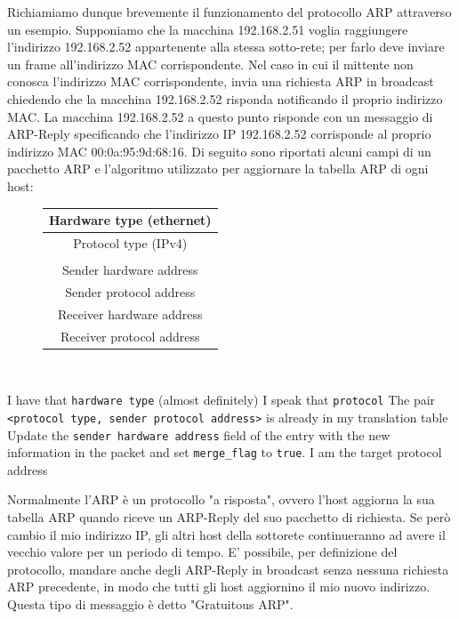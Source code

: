 Richiamiamo dunque brevemente il funzionamento del protocollo ARP attraverso un esempio. Supponiamo che la macchina 192.168.2.51 voglia raggiungere l'indirizzo 192.168.2.52 appartenente alla stessa sotto-rete; per farlo deve inviare un frame all'indirizzo MAC corrispondente. Nel caso in cui il mittente non conosca l'indirizzo MAC corrispondente, invia una richiesta ARP in broadcast chiedendo che la macchina 192.168.2.52 risponda notificando il proprio indirizzo MAC. La macchina 192.168.2.52 a questo punto risponde con un messaggio di ARP-Reply specificando che l'indirizzo IP 192.168.2.52 corrisponde al proprio indirizzo MAC 00:0a:95:9d:68:16. Di seguito sono riportati alcuni campi di un pacchetto ARP e l'algoritmo utilizzato per aggiornare la tabella ARP di ogni host:
\begin{figure}[htbp]
	\centering
	\begin{tabular}{|c|}
		\hline
		Hardware type (ethernet) \\
		\hline
		Protocol type (IPv4) \\
		\hline
		[$\dots$] \\
		\hline
		Sender hardware address \\
		\hline
		Sender protocol address \\
		\hline
		Receiver hardware address \\
		\hline
		Receiver protocol address \\ \hline
	\end{tabular}
\end{figure}\\
\begin{codebox}
\li \If I have that \texttt{hardware type} (almost definitely)
\li \Then \If I speak that \texttt{protocol}
\li \Then \If The pair \texttt{<protocol type, sender protocol address>} is already in my translation table
\li \Then Update the \texttt{sender hardware address} field of the entry with the new information
\li in the packet and set \texttt{merge\_flag} to \texttt{true}.
\li \If I am the target protocol address
\li \Then [$\dots$] \End \End \End \End
\end{codebox}
Normalmente l'ARP è un protocollo "a risposta", ovvero l'host aggiorna la sua tabella ARP quando riceve un ARP-Reply del suo pacchetto di richiesta. Se però cambio il mio indirizzo IP, gli altri host della sottorete continueranno ad avere il vecchio valore per un periodo di tempo. E' possibile, per definizione del protocollo, mandare anche degli ARP-Reply in broadcast senza nessuna richiesta ARP precedente, in modo che tutti gli host aggiornino il mio nuovo indirizzo. Questa tipo di messaggio è detto  "Gratuitous ARP".\\

